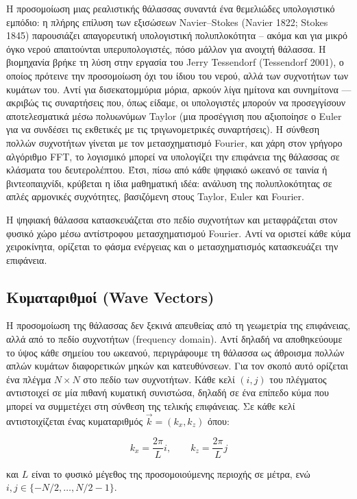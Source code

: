 \documentclass[a4paper, 11pt]{article}
\begin{document}
Η προσομοίωση μιας ρεαλιστικής θάλασσας συναντά ένα θεμελιώδες
υπολογιστικό εμπόδιο: η πλήρης επίλυση των εξισώσεων Navier--Stokes
(Navier 1822; Stokes 1845) παρουσιάζει απαγορευτική υπολογιστική
πολυπλοκότητα -- ακόμα και για μικρό όγκο νερού απαιτούνται
υπερυπολογιστές, πόσο μάλλον για ανοιχτή θάλασσα. Η βιομηχανία βρήκε τη
λύση στην εργασία του Jerry Tessendorf (Tessendorf 2001), ο οποίος
πρότεινε την προσομοίωση όχι του ίδιου του νερού, αλλά των συχνοτήτων
των κυμάτων του. Αντί για δισεκατομμύρια μόρια, αρκούν λίγα ημίτονα και
συνημίτονα --- ακριβώς τις συναρτήσεις που, όπως είδαμε, οι υπολογιστές
μπορούν να προσεγγίσουν αποτελεσματικά μέσω πολυωνύμων Taylor (μια
προσέγγιση που αξιοποίησε ο Euler για να συνδέσει τις εκθετικές με τις
τριγωνομετρικές συναρτήσεις). Η σύνθεση πολλών συχνοτήτων γίνεται με τον
μετασχηματισμό Fourier, και χάρη στον γρήγορο αλγόριθμο FFT, το
λογισμικό μπορεί να υπολογίζει την επιφάνεια της θάλασσας σε κλάσματα
του δευτερολέπτου. Έτσι, πίσω από κάθε ψηφιακό ωκεανό σε ταινία ή
βιντεοπαιχνίδι, κρύβεται η ίδια μαθηματική ιδέα: ανάλυση της
πολυπλοκότητας σε απλές αρμονικές συχνότητες, βασιζόμενη στους Taylor,
Euler και Fourier.

Η ψηφιακή θάλασσα κατασκευάζεται στο πεδίο συχνοτήτων και μεταφράζεται
στον φυσικό χώρο μέσω αντίστροφου μετασχηματισμού Fourier. Αντί να
οριστεί κάθε κύμα χειροκίνητα, ορίζεται το φάσμα ενέργειας και ο
μετασχηματισμός κατασκευάζει την επιφάνεια.

\subsection{Κυματαριθμοί (Wave
Vectors)}\label{ux3baux3c5ux3bcux3b1ux3c4ux3b1ux3c1ux3b9ux3b8ux3bcux3bfux3af-wave-vectors}

Η προσομοίωση της θάλασσας δεν ξεκινά απευθείας από τη γεωμετρία της
επιφάνειας, αλλά από το πεδίο συχνοτήτων (frequency domain). Αντί δηλαδή
να αποθηκεύουμε το ύψος κάθε σημείου του ωκεανού, περιγράφουμε τη
θάλασσα ως άθροισμα πολλών απλών κυμάτων διαφορετικών μηκών και
κατευθύνσεων. Για τον σκοπό αυτό ορίζεται ένα πλέγμα \(N \times N\) στο
πεδίο των συχνοτήτων. Κάθε κελί \((i,j)\) του πλέγματος αντιστοιχεί σε
μία πιθανή κυματική συνιστώσα, δηλαδή σε ένα επίπεδο κύμα που μπορεί να
συμμετέχει στη σύνθεση της τελικής επιφάνειας. Σε κάθε κελί
αντιστοιχίζεται ένας κυματαριθμός \(\vec{k} = (k_x, k_z)\) όπου:

\[
k_x = \frac{2\pi}{L}i,
\qquad
k_z = \frac{2\pi}{L}j
\]

και \(L\) είναι το φυσικό μέγεθος της προσομοιούμενης περιοχής σε μέτρα,
ενώ \(i,j \in \{-N/2,\dots,N/2-1\}\).
\end{document}

